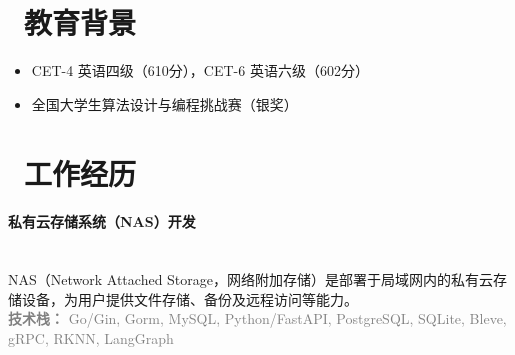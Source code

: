 \documentclass{resume}
\begin{document}
\section{\faGraduationCap\ 教育背景}
\begin{itemize}
\item CET-4 英语四级（610分），CET-6 英语六级（602分）
\item 全国大学生算法设计与编程挑战赛（银奖）
\end{itemize}

\newpage
\section{\faSuitcase\ 工作经历}

\paragraph*{私有云存储系统（NAS）开发}\mbox{}\\
{\small
\noindent NAS（Network Attached Storage，网络附加存储）是部署于局域网内的私有云存储设备，为用户提供文件存储、备份及远程访问等能力。\\
\noindent\textcolor{gray}{\textbf{技术栈：} Go/Gin, Gorm, MySQL, Python/FastAPI, PostgreSQL, SQLite, Bleve, gRPC, RKNN, LangGraph}
}
\vspace{1ex}
\end{document}
